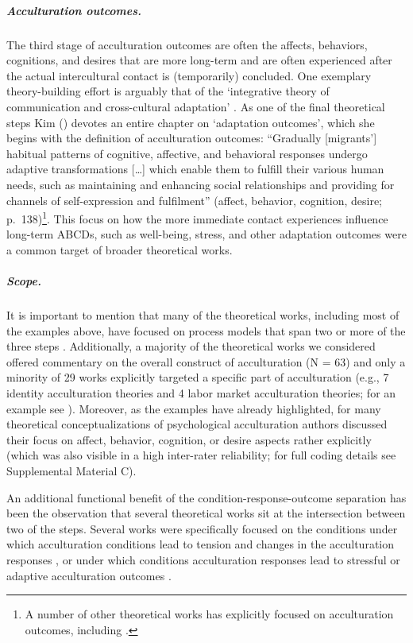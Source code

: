 \subparagraph{Acculturation outcomes.}

The third stage of acculturation outcomes are often the affects,
behaviors, cognitions, and desires that are more long-term and are often
experienced after the actual intercultural contact is (temporarily)
concluded. One exemplary theory-building effort is arguably that of the
`integrative theory of communication and cross-cultural adaptation'
\citep[][]{Kim1988}. As one of the final theoretical steps Kim
(\citeyear[][]{Kim1988}) devotes an entire chapter on `adaptation
outcomes', which she begins with the definition of acculturation
outcomes: ``Gradually {[}migrants'{]} habitual patterns of cognitive,
affective, and behavioral responses undergo adaptive transformations
{[}\ldots{]} which enable them to fulfill their various human needs,
such as maintaining and enhancing social relationships and providing for
channels of self-expression and fulfilment'' (affect, behavior,
cognition, desire;
p.~138)\footnote{A number of other theoretical works has explicitly focused on acculturation outcomes, including \citet[][]{Baird2015, Berry1998, Berry1992, Berry2005, Riedel2011, Rogler1994, Luedicke2011}.}.
This focus on how the more immediate contact experiences influence
long-term ABCDs, such as well-being, stress, and other adaptation
outcomes were a common target of broader theoretical works.

\subparagraph{Scope.}

It is important to mention that many of the theoretical works, including
most of the examples above, have focused on process models that span two
or more of the three steps
\citep[e.g.,][]{Berry1992, Ward2016, Arends-Toth2006a, Rogler1994}.
Additionally, a majority of the theoretical works we considered offered
commentary on the overall construct of acculturation (N = 63) and only a
minority of 29 works explicitly targeted a specific part of
acculturation (e.g., 7 identity acculturation theories and 4 labor
market acculturation theories; for an example see
\citealp{Weinreich2009}). Moreover, as the examples have already
highlighted, for many theoretical conceptualizations of psychological
acculturation authors discussed their focus on affect, behavior,
cognition, or desire aspects rather explicitly (which was also visible
in a high inter-rater reliability; for full coding details see
Supplemental Material C).

An additional functional benefit of the condition-response-outcome
separation has been the observation that several theoretical works sit
at the intersection between two of the steps. Several works were
specifically focused on the conditions under which acculturation
conditions lead to tension and changes in the acculturation responses
\citep[i.e., conditions of change; e.g.,][]{Masgoret2006, Alitolppa-Niitamo2004, Grove1985, Wood2014},
or under which conditions acculturation responses lead to stressful or
adaptive acculturation outcomes
\citep[i.e., conditions of stress; e.g.,][; also see  and Figure S1 in Supplemental Material E]{Ryan2008, Berry1992, Benet-Martinez2005, Salo2015, Wood2014, Hajro2019}.

